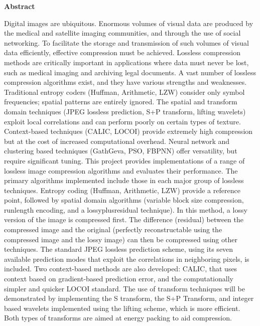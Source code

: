 \begin{flushright}
\huge{\textbf{Abstract}}
\end{flushright}

\vspace{0.5cm}


Digital images are ubiquitous. Enormous volumes of visual data are produced by the medical and satellite imaging communities, and through the use of social networking. To facilitate the storage and transmission of such volumes of visual data efficiently, effective compression must be achieved. Lossless compression methods are critically important in applications where data must never be lost, such as medical imaging and archiving legal documents.
A vast number of lossless compression algorithms exist, and they have various strengths and weaknesses. Traditional entropy coders (Huffman, Arithmetic, LZW) consider only symbol frequencies; spatial patterns are entirely ignored. The spatial and transform domain techniques (JPEG lossless prediction, S+P transform, lifting wavelets) exploit local correlations and can perform poorly on certain types of texture. Context-based techniques (CALIC, LOCOI) provide extremely high compression but at the cost of increased computational overhead. Neural network and clustering based techniques (GathGeva, PSO, FBPNN) offer versatility, but require significant tuning.
This project provides implementations of a range of lossless image compression algorithms and evaluates their performance. The primary algorithms implemented include those in each major group of lossless techniques. Entropy coding (Huffman, Arithmetic, LZW) provide a reference point, followed by spatial domain algorithms (variable block size compression, runlength encoding, and a lossyplusresidual technique). In this method, a lossy version of the image is compressed first. The difference (residual) between the compressed image and the original (perfectly reconstructable using the compressed image and the lossy image) can then be compressed using other techniques.
The standard JPEG lossless prediction scheme, using its seven available prediction modes that exploit the correlations in neighboring pixels, is included. Two context-based methods are also developed: CALIC, that uses context based on gradient-based prediction error, and the computationally simpler and quicker LOCOI standard.
The use of transform techniques will be demonstrated by implementing the S transform, the S+P Transform, and integer based wavelets implemented using the lifting scheme, which is more efficient. Both types of transforms are aimed at energy packing to aid compression.
